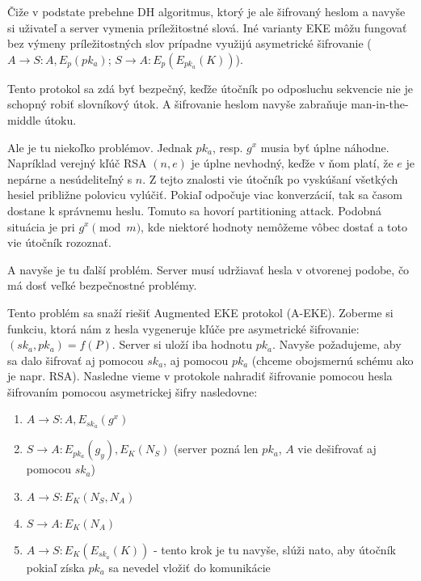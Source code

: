 Čiže v podstate prebehne DH algoritmus, ktorý je ale šifrovaný heslom a navyše
si uživateľ a server vymenia príležitostné slová.
Iné varianty EKE môžu fungovať bez výmeny príležitostných slov prípadne využijú asymetrické
šifrovanie ($A\to S\colon A, E_p(pk_a)$; $S\to A\colon E_p(E_{pk_a}(K))$).

Tento protokol sa zdá byť bezpečný, keďže útočník po odposluchu sekvencie nie je schopný
robiť slovníkový útok. A šifrovanie heslom navyše zabraňuje man-in-the-middle útoku.

Ale je tu niekoľko problémov. Jednak $pk_a$, resp. $g^x$ musia byť úplne náhodne.
Napríklad verejný kľúč RSA $(n,e)$ je úplne nevhodný, keďže v ňom platí, že $e$ je nepárne
a nesúdeliteľný s $n$. Z tejto znalosti vie útočník po vyskúšaní všetkých hesiel približne polovicu vylúčiť.
Pokiaľ odpočuje viac konverzácií, tak sa časom dostane k správnemu heslu. Tomuto sa hovorí partitioning attack.
Podobná situácia je pri $g^x \pmod m$, kde niektoré hodnoty nemôžeme vôbec dostať a toto vie útočník
rozoznať.

A navyše je tu ďalší problém. Server musí udržiavať hesla v otvorenej podobe, čo má dosť
veľké bezpečnostné problémy.

Tento problém sa snaží riešiť Augmented EKE protokol (A-EKE). Zoberme si funkciu, ktorá
nám z hesla vygeneruje kľúče pre asymetrické šifrovanie: $(sk_a, pk_a) = f(P)$. 
Server si uloží iba hodnotu $pk_a$. Navyše požadujeme, aby sa dalo šifrovať aj pomocou
$sk_a$, aj pomocou $pk_a$ (chceme obojsmernú schému ako je napr. RSA). Nasledne vieme v protokole
nahradiť šifrovanie pomocou hesla šifrovaním pomocou asymetrickej šifry nasledovne:
\begin{enumerate}
\item $A\to S\colon A, E_{sk_a}(g^x)$
\item $S\to A\colon E_{pk_a}(g_y), E_K(N_S)$ (server pozná len $pk_a$, $A$ vie dešifrovať aj pomocou $sk_a$)
\item $A\to S\colon E_K(N_S, N_A)$
\item $S\to A\colon E_K(N_A)$
\item $A\to S\colon E_K(E_{sk_a}(K))$ - tento krok je tu navyše, slúži nato, aby útočník pokiaľ získa $pk_a$ sa nevedel vložiť do komunikácie
\end{enumerate}

